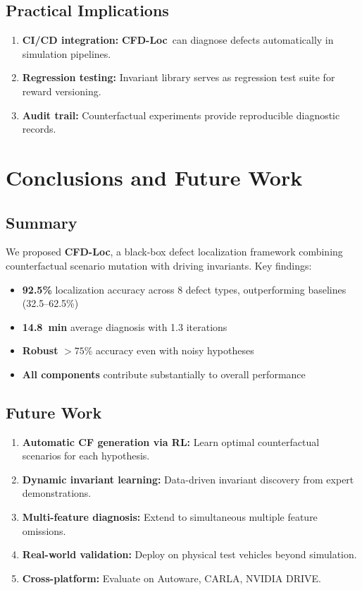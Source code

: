 \documentclass[conference]{IEEEtran}
\theoremstyle{plain}
\newcommand{\methodname}{\textbf{CFD-Loc}}
\begin{document}
\subsection{Practical Implications}
\begin{enumerate}[nosep]
    \item \textbf{CI/CD integration:} \methodname\ can diagnose defects automatically in simulation pipelines.
    \item \textbf{Regression testing:} Invariant library serves as regression test suite for reward versioning.
    \item \textbf{Audit trail:} Counterfactual experiments provide reproducible diagnostic records.
\end{enumerate}

\section{Conclusions and Future Work}
\label{sec:conclusion}

\subsection{Summary}
We proposed \methodname, a black-box defect localization framework combining counterfactual scenario mutation with driving invariants. Key findings:
\begin{itemize}[nosep]
    \item \textbf{92.5\%} localization accuracy across 8 defect types, outperforming baselines (32.5--62.5\%)
    \item \textbf{14.8~min} average diagnosis with 1.3 iterations
    \item \textbf{Robust} $>75\%$ accuracy even with noisy hypotheses
    \item \textbf{All components} contribute substantially to overall performance
\end{itemize}

\subsection{Future Work}
\begin{enumerate}
    \item \textbf{Automatic CF generation via RL:} Learn optimal counterfactual scenarios for each hypothesis.
    \item \textbf{Dynamic invariant learning:} Data-driven invariant discovery from expert demonstrations.
    \item \textbf{Multi-feature diagnosis:} Extend to simultaneous multiple feature omissions.
    \item \textbf{Real-world validation:} Deploy on physical test vehicles beyond simulation.
    \item \textbf{Cross-platform:} Evaluate on Autoware, CARLA, NVIDIA DRIVE.
\end{enumerate}
\end{document}
